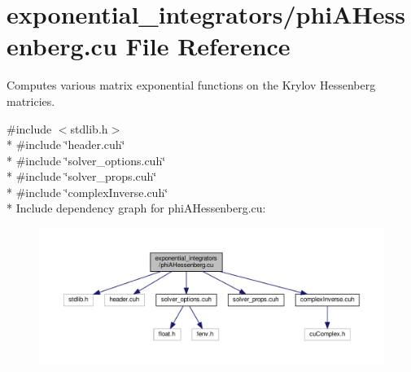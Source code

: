 \hypertarget{phiAHessenberg_8cu}{}\section{exponential\+\_\+integrators/phi\+A\+Hessenberg.cu File Reference}
\label{phiAHessenberg_8cu}


Computes various matrix exponential functions on the Krylov Hessenberg matricies.  


{\ttfamily \#include $<$stdlib.\+h$>$}\\*
{\ttfamily \#include \char`\"{}header.\+cuh\char`\"{}}\\*
{\ttfamily \#include \char`\"{}solver\+\_\+options.\+cuh\char`\"{}}\\*
{\ttfamily \#include \char`\"{}solver\+\_\+props.\+cuh\char`\"{}}\\*
{\ttfamily \#include \char`\"{}complex\+Inverse.\+cuh\char`\"{}}\\*
Include dependency graph for phi\+A\+Hessenberg.\+cu\+:\nopagebreak
\begin{figure}[H]
\begin{center}
\leavevmode
\includegraphics[width=350pt]{phiAHessenberg_8cu__incl}
\end{center}
\end{figure}

